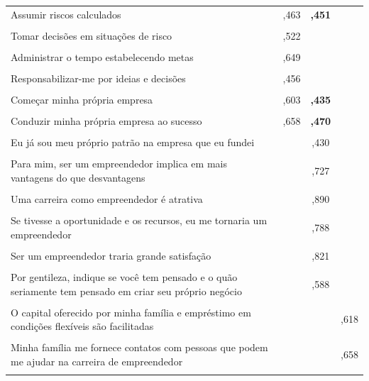 \begin{longtable}[!h]{p{6cm} c c c }
Assumir riscos calculados
 &   ,463 & \textbf{,451} & \\\\
 
Tomar decisões em situações de risco
 &   ,522 & & \\\\
 
Administrar o tempo estabelecendo metas
 &   ,649 & & \\\\
 
Responsabilizar-me por ideias e decisões
 & ,456 & &  \\\\
 
Começar minha própria empresa
& ,603 & \textbf{,435}  & \\\\

Conduzir minha própria empresa ao sucesso
 & ,658 & \textbf{,470}  & \\\\
Eu já sou meu próprio patrão na empresa que eu fundei
 & & ,430 &  \\\\

Para mim, ser um empreendedor implica em mais vantagens do que desvantagens
 &  & ,727  & \\\\
 
Uma carreira como empreendedor é atrativa
 &  & ,890  & \\\\
 
Se tivesse a oportunidade e os recursos, eu me tornaria um empreendedor
 &  & ,788 & \\\\
 
Ser um empreendedor traria grande satisfação
 &  & ,821 & \\\\
 
Por gentileza, indique se você tem pensado e o quão seriamente tem pensado em criar seu próprio negócio
 &  & ,588 & \\\\
 
O capital oferecido por minha família e empréstimo em condições flexíveis são facilitadas
 &  & & ,618 \\\\
 
Minha família me fornece contatos com pessoas que podem me ajudar na carreira de empreendedor
 &  & & ,658 \\\\
 

\end{longtable}
